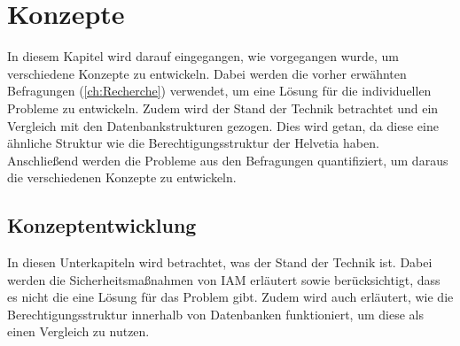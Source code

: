 \chapter{Konzepte}
\label{ch:chapter04}
In diesem Kapitel wird darauf eingegangen, wie vorgegangen wurde, um verschiedene Konzepte zu entwickeln.
Dabei werden die vorher erwähnten Befragungen (\ref{ch:Recherche}) verwendet, um eine Lösung für die individuellen Probleme zu entwickeln.
Zudem wird der Stand der Technik betrachtet und ein Vergleich mit den Datenbankstrukturen gezogen.
Dies wird getan, da diese eine ähnliche Struktur wie die Berechtigungsstruktur der Helvetia haben. 
Anschließend werden die Probleme aus den Befragungen quantifiziert, um daraus die verschiedenen Konzepte zu entwickeln.

\section{Konzeptentwicklung}
\label{sec:chapter04:Konzeptentwicklung}
In diesen Unterkapiteln wird betrachtet, was der Stand der Technik ist.
Dabei werden die Sicherheitsmaßnahmen von \ac{IAM} erläutert sowie berücksichtigt, dass es nicht die eine Lösung für das Problem gibt.
Zudem wird auch erläutert, wie die Berechtigungsstruktur innerhalb von Datenbanken funktioniert, um diese als einen Vergleich zu nutzen.  

